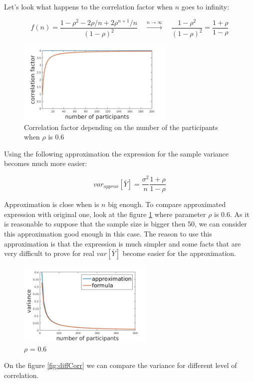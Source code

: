 \documentclass[12pt]{report}
\begin{document}
Let's look what happens to the correlation factor when $n$ goes to infinity:

$$f(n)  = \frac{1-\rho^2 - 2\rho/n + 2\rho^{n+1}/n}{(1-\rho)^2} \quad \xrightarrow{n\to \infty} \quad\frac{1-\rho^2}{(1-\rho)^2} = \frac{1+\rho}{1-\rho}$$

\begin{figure}[ht]
    \centering
    \includegraphics[height=150px]{corrFactor}
    \caption{ Correlation factor depending on the number of the participants when $\rho$ is 0.6 }
\end{figure}

Using the following approximation the expression for the sample variance becomes much more easier:

$$var_{approx}\left[\bar{Y} \right] = \frac{\sigma^2}{n} \frac{1+\rho}{1-\rho}$$


Approximation is close when is $n$ big enough. To compare approximated expression with original one, look at the figure \ref{fig:lineGame1} where parameter $\rho$ is $0.6$. As it is reasonable to suppose that the sample size is bigger then 50, we can consider this approximation good enough in this case. The reason to use this approximation is that the expression is much simpler and some facts that are very difficult to prove for real $var\left[\bar{Y} \right]$ become easier for the approximation.

\begin{figure}[ht]
    \centering
    \includegraphics[height=150px]{lineGame1}
    \caption{ $\rho$ = 0.6 }
    \label{fig:lineGame1}
\end{figure}

On the figure \ref{fig:diffCorr} we can compare the variance for different level of correlation.
\end{document}
